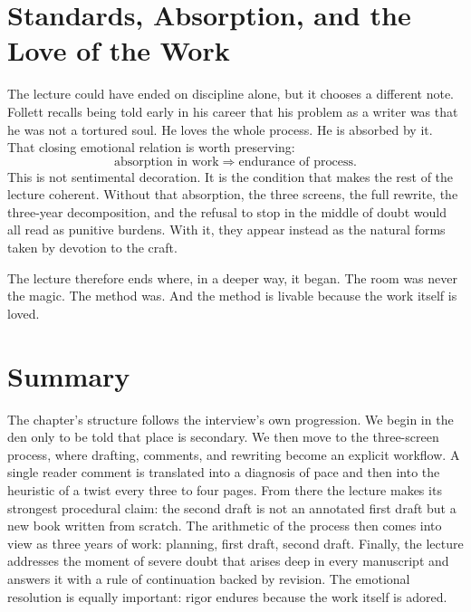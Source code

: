 \section{Standards, Absorption, and the Love of the Work}

The lecture could have ended on discipline alone, but it chooses a different note. Follett recalls being told early in his career that his problem as a writer was that he was not a tortured soul. He loves the whole process. He is absorbed by it. That closing emotional relation is worth preserving:
\begin{equation}
\text{absorption in work} \Rightarrow \text{endurance of process}.
\end{equation}
This is not sentimental decoration. It is the condition that makes the rest of the lecture coherent. Without that absorption, the three screens, the full rewrite, the three-year decomposition, and the refusal to stop in the middle of doubt would all read as punitive burdens. With it, they appear instead as the natural forms taken by devotion to the craft.

The lecture therefore ends where, in a deeper way, it began. The room was never the magic. The method was. And the method is livable because the work itself is loved.

\section{Summary}

The chapter's structure follows the interview's own progression. We begin in the den only to be told that place is secondary. We then move to the three-screen process, where drafting, comments, and rewriting become an explicit workflow. A single reader comment is translated into a diagnosis of pace and then into the heuristic of a twist every three to four pages. From there the lecture makes its strongest procedural claim: the second draft is not an annotated first draft but a new book written from scratch. The arithmetic of the process then comes into view as three years of work: planning, first draft, second draft. Finally, the lecture addresses the moment of severe doubt that arises deep in every manuscript and answers it with a rule of continuation backed by revision. The emotional resolution is equally important: rigor endures because the work itself is adored.